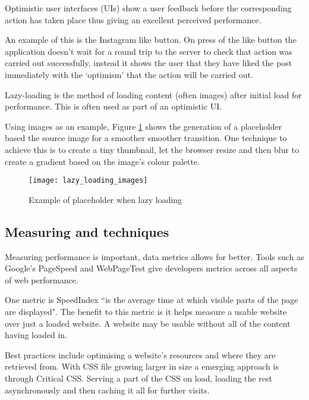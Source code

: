 Optimistic user interfaces (UIs) show a user feedback before the corresponding action has taken place thus giving an excellent perceived performance.

An example of this is the Instagram like button. On press of the like button the application doesn't wait for a round trip to the server to check that action was carried out successfully, instead it shows the user that they have liked the post immediately with the `optimism' that the action will be carried out. \cite{performing_actions_optimisitically}

Lazy-loading is the method of loading content (often images) after initial load for performance. This is often used as part of an optimistic UI.

Using images as an example, Figure \ref{figure-lazy-loading-images} shows the generation of a placeholder based the source image for a smoother smoother transition. One technique to achieve this is to create a tiny thumbnail, let the browser resize and then blur to create a gradient based on the image's colour palette. \cite{image_colours_lazy_loading}

\begin{figure}[H]
  \centering
    \texttt{[image: lazy\_loading\_images]}
  \caption{Example of placeholder when lazy loading \protect\cite{image_colours_lazy_loading}}
  \label{figure-lazy-loading-images}
\end{figure}

\subsection{Measuring and techniques} \label{l-r--measuring-and-techniques}

Measuring performance is important, data metrics allows for better. Tools such as Google's PageSpeed and WebPageTest give developers metrics across all aspects of web performance.

One metric is SpeedIndex ``is the average time at which visible parts of the page are displayed". The benefit to this metric is it helps measure a usable website over just a loaded website. A website may be usable without all of the content having loaded in. \cite{speed_index}

Best practices include optimising a website's resources and where they are retrieved from. With CSS file growing larger in size a emerging approach is through Critical CSS. Serving a part of the CSS on load, loading the rest asynchronously and then caching it all for further visits. \cite{fast_as_heck}

